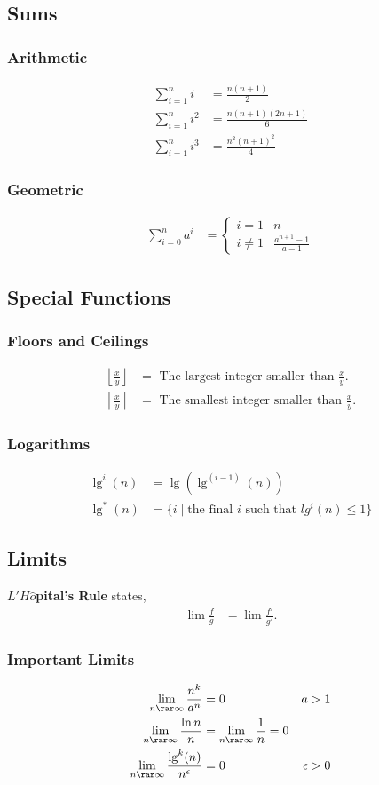 \subsection{Sums}
\subsubsection{Arithmetic}
\begin{align*}
    \sum_{i=1}^{n} i &= \frac{n(n+1)}{2} \\
    \sum_{i=1}^{n} i^2 &= \frac{n(n + 1)(2n + 1)}{6} \\
    \sum_{i=1}^{n} i^3 &= \frac{n^2(n+1)^2}{4}
\end{align*}
\subsubsection{Geometric}
\begin{align*}
    \sum_{i = 0}^{n} a^i &= \begin{cases}
                                i = 1 & n \\
                                i \neq 1 & \frac{a^{n + 1} - 1}{a - 1}
                            \end{cases}
\end{align*}

\subsection{Special Functions}
\subsubsection{Floors and Ceilings}
\begin{align*}
    \left\lfloor \frac{x}{y} \right\rfloor &= \text{ The largest integer smaller than } \frac{x}{y}. \\
    \left\lceil \frac{x}{y} \right\rceil &= \text{ The smallest integer smaller than } \frac{x}{y}.
\end{align*}
\subsubsection{Logarithms}
\begin{align*}
    \lg^i (n) &= \lg(\lg^{(i-1)}(n)) \\
    \lg^* (n) &= \{ i \; | \; \text{the final $i$ such that } lg^i (n) \leq 1 \}
\end{align*}

\subsection{Limits}
\begin{defn}
    \textbf{$L'H\hat{o}$pital's Rule} states,
    \begin{align*}
        \lim \frac{f}{g} &= \lim \frac{f'}{g'}.
    \end{align*}
\end{defn}
\subsubsection{Important Limits}
\begin{align*}
    \lim_{n \rar \infty} \frac{n^k}{a^n} &= 0 & a > 1 \\
    \lim_{n \rar \infty} \frac{\ln n}{n} &= \lim_{n \rar \infty} \frac{1}{n} = 0 \\
    \lim_{n \rar \infty} \frac{\lg^k (n)}{n^{\epsilon}} &= 0 & \epsilon > 0
\end{align*}